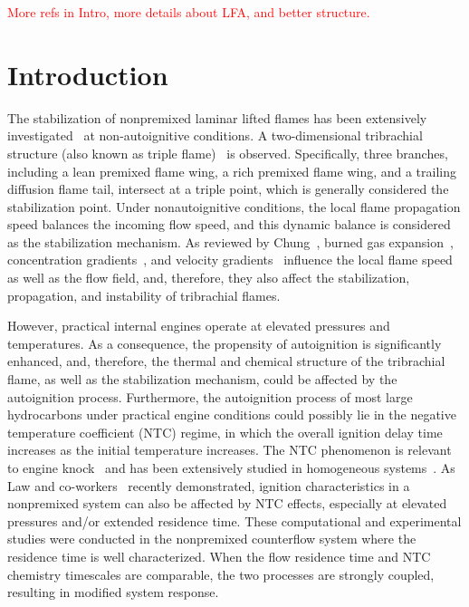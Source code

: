 \documentclass[review,3p,times]{elsarticle}
\begin{document}
\textcolor{red}{More refs in Intro, more details about LFA, and better structure.}

\section{Introduction}

The stabilization of nonpremixed laminar lifted flames has been extensively investigated~\cite{chung07} at non-autoignitive conditions. A two-dimensional tribrachial structure (also known as triple flame)~\cite{buckmaster02} is observed.  Specifically, three branches, including a lean premixed flame wing, a rich premixed flame wing, and a trailing diffusion flame tail, intersect at a triple point, which is generally considered the stabilization point.  Under nonautoignitive conditions, the local flame propagation speed balances the incoming flow speed, and this dynamic balance is considered as the stabilization mechanism.  As reviewed by Chung~\cite{chung07}, burned gas expansion~\cite{ruetsch95,lee97,plessing98,kioni99}, concentration gradients~\cite{dold89,hartley91,ghosal00}, and velocity gradients~\cite{kim07} influence the local flame speed as well as the flow field, and, therefore, they also affect the stabilization, propagation, and instability of tribrachial flames.

However, practical internal engines operate at elevated pressures and temperatures.  As a consequence, the propensity of autoignition is significantly enhanced, and, therefore, the thermal and chemical structure of the tribrachial flame, as well as the stabilization mechanism, could be affected by the autoignition process.  Furthermore, the autoignition process of most large hydrocarbons under practical engine conditions could possibly lie in the negative temperature coefficient (NTC) regime, in which the overall ignition delay time increases as the initial temperature increases.  The NTC phenomenon is relevant to engine knock~\cite{battin-leclerc08} and has been extensively studied in homogeneous systems~\cite{zador11}.  As Law and co-workers~\cite{law12,zhao13,deng14} recently demonstrated, ignition characteristics in a nonpremixed system can also be affected by NTC effects, especially at elevated pressures and/or extended residence time.  These computational and experimental studies were conducted in the nonpremixed counterflow system where the residence time is well characterized.  When the flow residence time and NTC chemistry timescales are comparable, the two processes are strongly coupled, resulting in modified system response.
\end{document}
